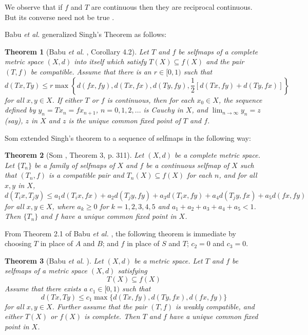\documentclass[a4paper,12pt,oneside]{article}
\newtheorem{theorem}{Theorem}[section]
\numberwithin{equation}{section}
\begin{document}
We observe that if $f$ and $T$ are continuous then they are reciprocal continuous. But its converse need not be true \cite{Pant1998}.

Babu \emph{et al.} \cite{Babu2007} generalized Singh's Theorem \cite{Singh1997a} as follows:

\begin{theorem}[Babu \emph{et al.} \cite{Babu2007}, Corollary 4.2] \label{thrm 1.5}
Let $T$ and $f$ be selfmaps of a complete metric space $(X,d)$ into itself which satisfy $T(X)\subseteq f(X)$ and the pair $(T,f)$ be compatible. Assume that there is an $r\in[0,1)$ such that
\begin{equation}
d(Tx,Ty)\leq r\max\left\{d(fx,fy),d(Tx,fx),d(Ty,fy),\frac{1}{2}[d(Tx,fy)+d(Ty,fx)]\right\}
\end{equation}
for all $x,y\in X$. If either $T$ or $f$ is continuous, then for each $x_0\in X$, the sequence defined by $y_n=Tx_n=fx_{n+1}$, $n=0,1,2,...$ is Cauchy in $X$, and $\lim_{n\to\infty}y_n=z$ (say), $z$ in $X$ and $z$ is the unique common fixed point of $T$ and $f$.
\end{theorem}

Som \cite{Som2003} extended Singh's theorem \cite{Singh1997a} to a sequence of selfmaps in the
following way:

\begin{theorem}[Som \cite{Som2003}, Theorem 3, p. 311] \label{Thrm 1.6}
Let $(X,d)$ be a complete metric space. Let $\{T_{n}\}$ be a family of selfmaps of $X$ and $f$ be a continuous selfmap of $X$ such that $(T_{n},f)$ is a compatible pair and $T_{n}(X)\subseteq f(X)$ for each $n$, and for all $x,y$ in $X$,
\begin{equation} \label{(1.6.1)}
d(T_{i}x,T_{j}y) \leq a_{1}d(T_{i}x,fx) + a_{2}d(T_{j}y,fy) + a_{3}d(T_{i}x,fy) + a_{4}d(T_{j}y,fx) + a_{5}d(fx,fy)
\end{equation}
for all $x,y\in X$, where $a_{k}\geq 0$ for $k=1,2,3,4,5$ and $a_{1}+a_{2}+a_{3}+a_{4}+a_{5}<1$. Then $\{T_{n}\}$ and $f$ have a unique common fixed point in $X$.
\end{theorem}

From Theorem 2.1 of Babu \emph{et al.} \cite{Babu2004}, the following theorem is immediate by choosing $T$ in place of $A$ and $B$; and $f$ in place of $S$ and $T$; $c_{2}=0$ and $c_{3}=0$.

\begin{theorem}[Babu \emph{et al.} \cite{Babu2004}] \label{thrm 1.7}
Let $(X,d)$ be a metric space. Let $T$ and $f$ be selfmaps of a metric space $(X,d)$ satisfying
\begin{equation} \label{(1.7.1)}
T(X)\subseteq f(X)
\end{equation}
Assume that there exists a $c_{1}\in[0,1)$ such that
\begin{equation} \label{(1.7.2)}
d(Tx,Ty) \leq c_{1}\max\{d(Tx,fy),d(Ty,fx),d(fx,fy)\}
\end{equation}
for all $x,y\in X$. Further assume that the pair $(T,f)$ is weakly compatible, and either $T(X)$ or $f(X)$ is complete. Then $T$ and $f$ have a unique common fixed point in $X$.
\end{theorem}
\end{document}
